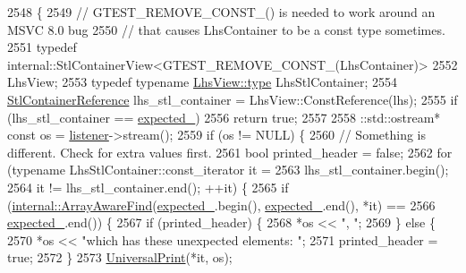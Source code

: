 \begin{DoxyCode}
2548                                                             \{
2549     \textcolor{comment}{// GTEST\_REMOVE\_CONST\_() is needed to work around an MSVC 8.0 bug}
2550     \textcolor{comment}{// that causes LhsContainer to be a const type sometimes.}
2551     \textcolor{keyword}{typedef} internal::StlContainerView<GTEST\_REMOVE\_CONST\_(LhsContainer)>
2552         LhsView;
2553     \textcolor{keyword}{typedef} \textcolor{keyword}{typename} \hyperlink{namespacegenerate__debs_a50bc9a7ecac9584553e089a448bcde58}{LhsView::type} LhsStlContainer;
2554     \hyperlink{classtesting_1_1internal_1_1ContainerEqMatcher_aaaeaacf0c557fe701a83e108d47edb23}{StlContainerReference} lhs\_stl\_container = LhsView::ConstReference(lhs);
2555     \textcolor{keywordflow}{if} (lhs\_stl\_container == \hyperlink{classtesting_1_1internal_1_1ContainerEqMatcher_ab5d9ad6869dc59908a4b1c72fde78d31}{expected\_})
2556       \textcolor{keywordflow}{return} \textcolor{keyword}{true};
2557 
2558     ::std::ostream* \textcolor{keyword}{const} os = \hyperlink{namespaceinteractive__marker_a0e579ab555212bb5e2c9f8a675b7618a}{listener}->stream();
2559     \textcolor{keywordflow}{if} (os != NULL) \{
2560       \textcolor{comment}{// Something is different. Check for extra values first.}
2561       \textcolor{keywordtype}{bool} printed\_header = \textcolor{keyword}{false};
2562       \textcolor{keywordflow}{for} (\textcolor{keyword}{typename} LhsStlContainer::const\_iterator it =
2563                lhs\_stl\_container.begin();
2564            it != lhs\_stl\_container.end(); ++it) \{
2565         \textcolor{keywordflow}{if} (\hyperlink{namespacetesting_1_1internal_a94a857fe6ff32cf4fdc4769a4071f239}{internal::ArrayAwareFind}(\hyperlink{classtesting_1_1internal_1_1ContainerEqMatcher_ab5d9ad6869dc59908a4b1c72fde78d31}{expected\_}.begin(), 
      \hyperlink{classtesting_1_1internal_1_1ContainerEqMatcher_ab5d9ad6869dc59908a4b1c72fde78d31}{expected\_}.end(), *it) ==
2566             \hyperlink{classtesting_1_1internal_1_1ContainerEqMatcher_ab5d9ad6869dc59908a4b1c72fde78d31}{expected\_}.end()) \{
2567           \textcolor{keywordflow}{if} (printed\_header) \{
2568             *os << \textcolor{stringliteral}{", "};
2569           \} \textcolor{keywordflow}{else} \{
2570             *os << \textcolor{stringliteral}{"which has these unexpected elements: "};
2571             printed\_header = \textcolor{keyword}{true};
2572           \}
2573           \hyperlink{namespacetesting_1_1internal_a30708fa2bacf11895b03bdb21eb72309}{UniversalPrint}(*it, os);

\end{DoxyCode}
